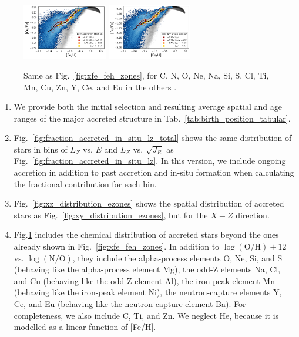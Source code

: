 \documentclass[fleqn,usenatbib]{mnras}
\begin{document}
\begin{figure}
    \includegraphics[width=0.33\textwidth]{figures/xfe_feh_zones_Ce.png}
    \includegraphics[width=0.33\textwidth]{figures/xfe_feh_zones_Eu.png}
    \caption{Same as Fig.~\ref{fig:xfe_feh_zones}, for C, N, O, Ne, Na, Si, S, Cl, Ti, Mn, Cu, Zn, Y, Ce, and Eu in the others \href{https://github.com/svenbuder/gse_nihaouhd/tree/main/figures}{\faGithub}.}
    \label{fig:additional_xfe_feh_zones}
\end{figure}

\begin{enumerate}[leftmargin=2em,labelwidth=0em]
    \item We provide both the initial selection and resulting average spatial and age ranges of the major accreted structure in Tab.~\ref{tab:birth_position_tabular}.
    \item Fig.~\ref{fig:fraction_accreted_in_situ_lz_total} shows the same distribution of stars in bins of $L_Z$ vs. $E$ and $L_Z$ vs. $\sqrt{J_R}$ as Fig.~\ref{fig:fraction_accreted_in_situ_lz}. In this version, we include ongoing accretion in addition to past accretion and in-situ formation when calculating the fractional contribution for each bin. 
    \item Fig.~\ref{fig:xz_distribution_ezones} shows the spatial distribution of accreted stars as Fig.~\ref{fig:xy_distribution_ezones}, but for the $X-Z$ direction.
      \item Fig.\ref{fig:additional_xfe_feh_zones} includes the chemical distribution of accreted stars beyond the ones already shown in Fig.~\ref{fig:xfe_feh_zones}. In addition to $\log(\mathrm{O/H}) + 12$ vs. $\log(\mathrm{N/O})$, they include the alpha-process elements O, Ne, Si, and S (behaving like the alpha-process element Mg), the odd-Z elements Na, Cl, and Cu (behaving like the odd-Z element Al), the iron-peak element Mn (behaving like the iron-peak element Ni), the neutron-capture elements Y, Ce, and Eu (behaving like the neutron-capture element Ba). For completeness, we also include C, Ti, and Zn. We neglect He, because it is modelled as a linear function of [Fe/H].
\end{enumerate}



\bsp
\label{lastpage}
\end{document}
